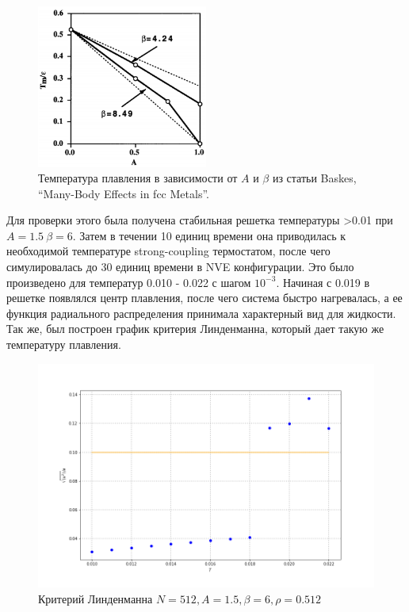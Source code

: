\documentclass[12pt]{article}
\begin{document}
\begin{figure}[h]
\centering
\includegraphics[width=0.50\textwidth]{temp_baskes}
\caption{Температура плавления в зависимости от $A$ и $\beta$ из статьи Baskes, “Many-Body Effects in fcc Metals”.}
\end{figure}
\FloatBarrier

Для проверки этого была получена стабильная решетка температуры >0.01 при $A=1.5 \ \beta=6$. Затем в течении 10 единиц времени она приводилась к необходимой температуре strong-coupling термостатом, после чего симулировалась до 30 единиц времени в NVE конфигурации. Это было произведено для температур 0.010 - 0.022 с шагом $10^{-3}$. Начиная с 0.019 в решетке появлялся центр плавления, после чего система быстро нагревалась, а ее функция радиального распределения принимала характерный вид для жидкости. Так же, был построен график критерия Линденманна, который дает такую же температуру плавления.

\begin{figure}[h]
\centering
\includegraphics[width=1.0\textwidth]{lind}
\caption{Критерий Линденманна $N=512, A=1.5, \beta=6, \rho=0.512$}
\end{figure}
\FloatBarrier
\end{document}
